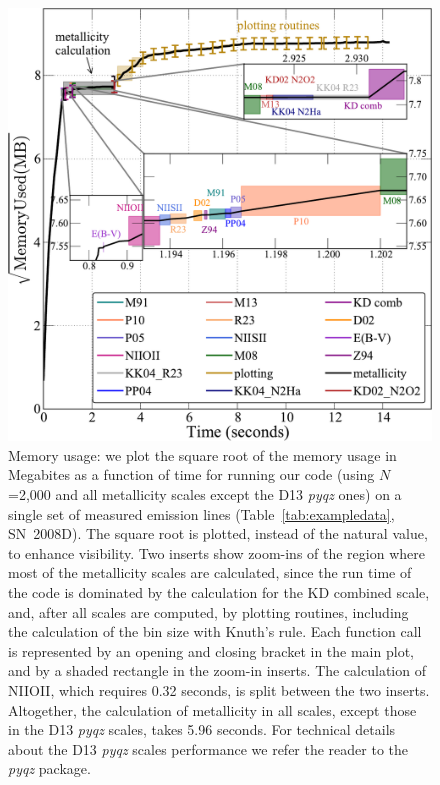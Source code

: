 \documentclass{emulateapj}
\begin{document}
\begin{figure}[ht!]
  \includegraphics[width=1.0\columnwidth]{memusage.pdf}
   \caption{Memory usage: we plot the square root of the memory usage in Megabites as a function of time for running our code (using $N$=2,000 and all metallicity scales except the D13 \emph{pyqz} ones) on a single set of measured emission lines (Table~\ref{tab:exampledata}, SN~2008D). The square root is plotted, instead of the natural value, to enhance visibility.  
Two inserts show zoom-ins of the region where most of the metallicity scales are calculated, since the run time of the code is dominated by the calculation for the KD combined scale, and, after all scales are computed, by plotting routines, including the calculation of the bin size with Knuth's rule. 
Each function call is represented by an opening and closing bracket in the main plot, and by a shaded rectangle in the zoom-in inserts.%
The calculation of NIIOII, which requires 0.32 seconds, is split between the two inserts. Altogether, the calculation of metallicity in all scales, except those in the D13 \emph{pyqz} scales, takes 5.96 seconds. For technical details about the D13 \emph{pyqz} scales performance we refer the reader to the \emph{pyqz} package.}
 \label{fig:mem}
\end{figure}
\end{document}
